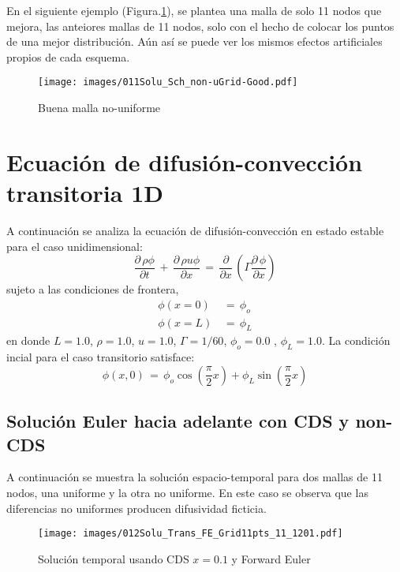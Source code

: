 \documentclass[9pt,technote,twoside,letterpaper,onecolumn]{IEEEtran}
\begin{document}
\begin{multicols}{2}
En el siguiente ejemplo (Figura.\ref{fig:sch_n-ugrid-good}), se plantea una malla de solo 11 nodos que mejora, las anteiores mallas de 11 nodos, solo con el hecho de colocar los puntos de una mejor distribución. Aún así se puede ver los mismos efectos artificiales propios de cada esquema.
\begin{figure}[H]
  \centering
  \texttt{[image: images/011Solu\_Sch\_non-uGrid-Good.pdf]}\\
  \label{fig:sch_n-ugrid-good}
  \caption{Buena malla no-uniforme}
\end{figure}

\section{Ecuación de difusión-convección transitoria 1D}
\label{sec:dif-conv-trans}
A continuación se analiza la ecuación de difusión-convección en estado estable para el caso unidimensional:
\begin{equation}
  \frac{\partial\,\rho\phi}{\partial t}\,+\,\frac{\partial\,\rho u \phi}{\partial x}\,=\,\frac{\partial}{\partial x}\,\left(\Gamma\frac{\partial\,\phi}{\partial x}\right)
  \label{eq:dif-conv-trans}
\end{equation}
sujeto a las condiciones de frontera,
\begin{align}
  \phi(x=0)\,&=\,\phi_o\\
  \phi(x=L)\,&=\,\phi_L
\end{align}
en donde $L=1.0$, $\rho=1.0$, $u=1.0$, $\Gamma=1/60$, $\phi_o=0.0$ , $\phi_L=1.0$. La condición incial para el caso transitorio satisface:
\begin{equation}
  \phi(x,0)\,=\,\phi_o\cos(\frac{\pi}{2}x)+\phi_L\sin(\frac{\pi}{2}x)
  \label{eq:dif-conv-trans-ci}
\end{equation}

\subsection{Solución Euler hacia adelante con CDS y non-CDS}
\label{sec:sol_ucds_noncds}

A continuación se muestra la solución espacio-temporal para dos mallas de 11 nodos, una uniforme y la otra no uniforme. En este caso se observa que las diferencias no uniformes producen difusividad ficticia.
\begin{figure}[H]
  \centering
  \texttt{[image: images/012Solu\_Trans\_FE\_Grid11pts\_11\_1201.pdf]}
  \caption{Solución temporal usando CDS $x=0.1$ y Forward Euler}
  \label{fig:trans_sol_cds_dx01}
\end{figure}


\end{multicols}
\end{document}
